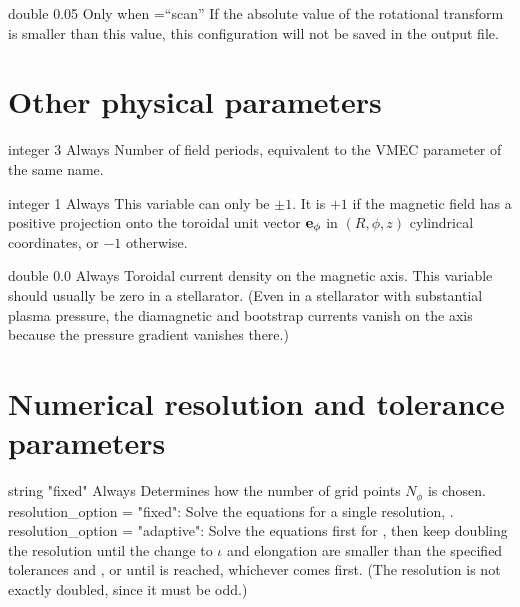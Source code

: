 {double}
{0.05}
{Only when ={\ttfamily ``scan''}}
{If the absolute value of the rotational transform is smaller than this value, this configuration will not be saved in the output file.
}

\myhrule



\section{Other physical parameters}

{integer}
{3}
{Always}
{Number of field periods, equivalent to the VMEC parameter of the same name.}

\myhrule

{integer}
{1}
{Always}
{This variable can only be $\pm 1$. It is $+1$ if the magnetic field has a positive projection onto the toroidal unit vector ${\mathbf e}_\phi$
in $(R,\phi,z)$ cylindrical coordinates, or $-1$ otherwise.}

\myhrule

{double}
{0.0}
{Always}
{Toroidal current density on the magnetic axis. This variable should usually be zero in a stellarator.  (Even in a stellarator with substantial plasma pressure, the diamagnetic and bootstrap currents vanish on the axis because the pressure gradient vanishes there.)}

\myhrule


\section{Numerical resolution and tolerance parameters}

{string}
{{\ttfamily "fixed"}}
{Always}
{Determines how the number of grid points $N_{\phi}$ is chosen.\\

{\ttfamily resolution\_option} = {\ttfamily "fixed"}: Solve the equations for a single resolution, .\\

{\ttfamily resolution\_option} = {\ttfamily "adaptive"}: Solve the equations first for , then keep doubling the resolution until the change to $\iota$ and elongation are smaller than the specified tolerances  and , or until  is reached, whichever comes first. (The resolution is not exactly doubled, since it must be odd.)\\

}


